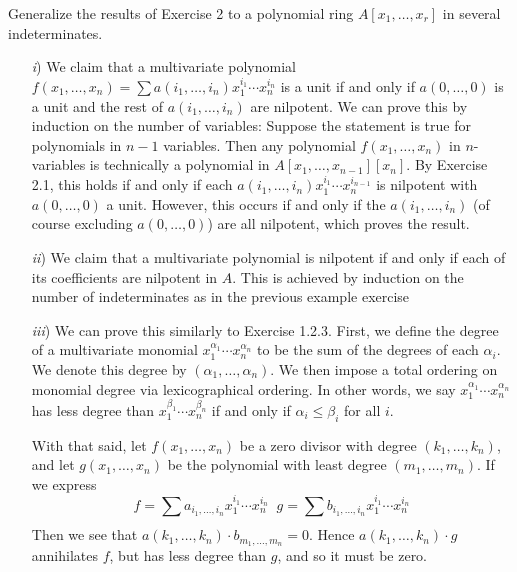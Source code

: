 \documentclass[10pt]{amsart}
\begin{document}
\begin{exercise}
    Generalize the results of Exercise 2 to a polynomial ring $A[x_1, \dots, x_r]$ in several indeterminates.
\end{exercise}

\begin{solution}
    \begin{itemize}
        \item[\emph{i})] We claim that a multivariate polynomial $f(x_1, \dots, x_n) = \sum a(i_1, \dots, i_n)x_1^{i_1}\cdots x_n^{i_n}$ 
        is a unit if and only if $a(0,\dots, 0)$ is a unit and the rest of $a(i_1, \dots, i_n)$ are nilpotent.
        We can prove this by induction on the number of variables: 
        Suppose the statement is true for polynomials in $n-1$ variables. Then any polynomial 
        $f(x_1, \dots, x_n)$ in $n$-variables is technically a polynomial in $A[x_1, \dots, x_{n-1}][x_n]$. 
        By Exercise 2.1, this holds if and only if each $a(i_1, \dots, i_n)x_1^{i_1}\cdots x_n^{i_{n-1}}$
        is nilpotent with $a(0,\dots,0)$ a unit. 
        However, this occurs if and only if the 
        $a(i_1, \dots, i_n)$ (of course excluding $a(0, \dots, 0)$) 
        are all nilpotent, which proves the result.

        \item[\emph{ii})] We claim that a multivariate polynomial is nilpotent if and only if each of 
        its coefficients are nilpotent in $A$. This is achieved by induction on the number of indeterminates 
        as in the previous example exercise

        \item[\emph{iii})] We can prove this similarly to Exercise 1.2.3. 
        First, we define the degree of a multivariate monomial $x_1^{\alpha_1} \cdots x_n^{\alpha_n}$ 
        to be the sum of the degrees of each $\alpha_i$. We denote this degree by $(\alpha_1, \dots, \alpha_n)$. 
        We then impose a total ordering on monomial 
        degree via lexicographical ordering. In other words, we say
        $x_1^{\alpha_1} \cdots x_n^{\alpha_n}$ has less degree than $x_1^{\beta_1} \cdots x_n^{\beta_n}$ 
        if and only if $\alpha_i \le \beta_i$ for all $i$. 

        With that said, let $f(x_1, \dots, x_n)$ be a zero divisor with degree $(k_1, \dots, k_n)$, 
        and let $g(x_1, \dots, x_n)$ be the polynomial with least degree $(m_1, \dots, m_n)$. 
        If we express 
        \[
            f = \sum_{}a_{i_1, \dots, i_n}x_1^{i_1}\cdots x_n^{i_n}
            \;\;
            g = \sum_{}b_{i_1, \dots, i_n}x_1^{i_1}\cdots x_n^{i_n}
        \]
        Then we see that $a(k_1, \dots, k_n)\cdot b_{m_1, \dots, m_n} = 0$. 
        Hence $a(k_1, \dots, k_n)\cdot g$ annihilates $f$, but has less degree than 
        $g$, and so it must be zero. 


\end{itemize}
\end{solution}
\end{document}
